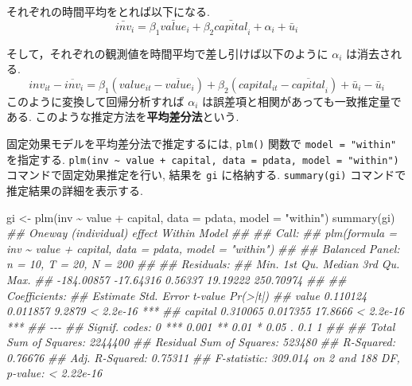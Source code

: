 \documentclass[
  letterpaper,
  xelatex,
  ja=standard, xelatex]{bxjsbook}
\newenvironment{Shaded}{\begin{snugshade}}{\end{snugshade}}
\newcommand{\AttributeTok}[1]{\textcolor[rgb]{0.40,0.45,0.13}{#1}}
\newcommand{\DocumentationTok}[1]{\textcolor[rgb]{0.37,0.37,0.37}{\textit{#1}}}
\newcommand{\FunctionTok}[1]{\textcolor[rgb]{0.28,0.35,0.67}{#1}}
\newcommand{\NormalTok}[1]{\textcolor[rgb]{0.00,0.23,0.31}{#1}}
\newcommand{\OtherTok}[1]{\textcolor[rgb]{0.00,0.23,0.31}{#1}}
\newcommand{\SpecialCharTok}[1]{\textcolor[rgb]{0.37,0.37,0.37}{#1}}
\newcommand{\StringTok}[1]{\textcolor[rgb]{0.13,0.47,0.30}{#1}}
\begin{document}
それぞれの時間平均をとれば以下になる. \[
\bar{inv}_{i} = \beta_1 \bar{value}_{i} + \beta_2 \bar{capital}_{i} +\alpha_i  + \bar{u}_{i}
\]

そして，それぞれの観測値を時間平均で差し引けば以下のように \(\alpha_i\)
は消去される. \[
inv_{it}-\overline{inv}_{i} = \beta_1 (value_{it}-\overline{value}_{i}) + \beta_2 (capital_{it}-\overline{capital}_{i})  + \bar{u}_{i} -\bar{u}_{i}
\] このように変換して回帰分析すれば \(\alpha_i\)
は誤差項と相関があっても一致推定量である.
このような推定方法を\textbf{平均差分法}という.

固定効果モデルを平均差分法で推定するには, \texttt{plm()} 関数で
\texttt{model\ =\ "within"} を指定する.
\texttt{plm(inv\ \textasciitilde{}\ value\ +\ capital,\ data\ =\ pdata,\ model\ =\ "within")}
コマンドで固定効果推定を行い, 結果を \texttt{gi} に格納する.
\texttt{summary(gi)} コマンドで推定結果の詳細を表示する.

\begin{Shaded}
\begin{Highlighting}[]
\NormalTok{gi }\OtherTok{\textless{}{-}} \FunctionTok{plm}\NormalTok{(inv }\SpecialCharTok{\textasciitilde{}}\NormalTok{ value }\SpecialCharTok{+}\NormalTok{ capital, }\AttributeTok{data =}\NormalTok{ pdata, }\AttributeTok{model =} \StringTok{"within"}\NormalTok{)}
\FunctionTok{summary}\NormalTok{(gi)}
\DocumentationTok{\#\# Oneway (individual) effect Within Model}
\DocumentationTok{\#\# }
\DocumentationTok{\#\# Call:}
\DocumentationTok{\#\# plm(formula = inv \textasciitilde{} value + capital, data = pdata, model = "within")}
\DocumentationTok{\#\# }
\DocumentationTok{\#\# Balanced Panel: n = 10, T = 20, N = 200}
\DocumentationTok{\#\# }
\DocumentationTok{\#\# Residuals:}
\DocumentationTok{\#\#       Min.    1st Qu.     Median    3rd Qu.       Max. }
\DocumentationTok{\#\# {-}184.00857  {-}17.64316    0.56337   19.19222  250.70974 }
\DocumentationTok{\#\# }
\DocumentationTok{\#\# Coefficients:}
\DocumentationTok{\#\#         Estimate Std. Error t{-}value  Pr(\textgreater{}|t|)    }
\DocumentationTok{\#\# value   0.110124   0.011857  9.2879 \textless{} 2.2e{-}16 ***}
\DocumentationTok{\#\# capital 0.310065   0.017355 17.8666 \textless{} 2.2e{-}16 ***}
\DocumentationTok{\#\# {-}{-}{-}}
\DocumentationTok{\#\# Signif. codes:  0 \textquotesingle{}***\textquotesingle{} 0.001 \textquotesingle{}**\textquotesingle{} 0.01 \textquotesingle{}*\textquotesingle{} 0.05 \textquotesingle{}.\textquotesingle{} 0.1 \textquotesingle{} \textquotesingle{} 1}
\DocumentationTok{\#\# }
\DocumentationTok{\#\# Total Sum of Squares:    2244400}
\DocumentationTok{\#\# Residual Sum of Squares: 523480}
\DocumentationTok{\#\# R{-}Squared:      0.76676}
\DocumentationTok{\#\# Adj. R{-}Squared: 0.75311}
\DocumentationTok{\#\# F{-}statistic: 309.014 on 2 and 188 DF, p{-}value: \textless{} 2.22e{-}16}
\end{Highlighting}
\end{Shaded}
\end{document}
